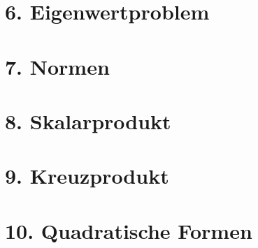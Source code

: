 \documentclass[8pt, a4paper, landscape, xcolor=dvipsnames]{extarticle}
\begin{document}
\begin{multicols*}{4}
\section{6. Eigenwertproblem}
\WhiteSpace
	
	
	
	
	
	
	

\section{7. Normen}
\WhiteSpace
	
	
	
	
	
\section{8. Skalarprodukt}
\WhiteSpace
	
	
	
	
	
\section{9. Kreuzprodukt}
\WhiteSpace
	
	
	
	
\section{10. Quadratische Formen}
\WhiteSpace
	
	
	
	
	
	
	
	


\end{multicols*}
\end{document}
